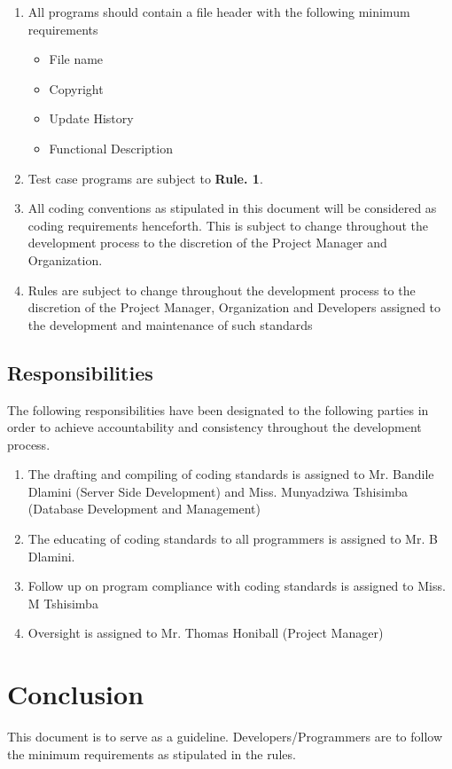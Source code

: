 \documentclass{article}
\begin{document}
\begin{enumerate}
    \item All programs should contain a file header with the following minimum requirements
    \begin{itemize}
        \item File name
        \item Copyright
        \item Update History
        \item Functional Description
    \end{itemize}{}
    
    \item Test case programs are subject to \textbf{Rule. 1}.
    \item All coding conventions as stipulated in this document will be considered as coding requirements henceforth. This is subject to change throughout the development process to the discretion of the Project Manager and Organization.
    \item Rules are subject to change throughout the development process to the discretion of the Project Manager, Organization and Developers assigned to the development and maintenance of such standards
\end{enumerate}

\subsection{Responsibilities}
The following responsibilities have been designated to the following parties in order to achieve accountability and consistency throughout the development process.

\begin{enumerate}
    \item The drafting and compiling of coding standards is assigned to Mr. Bandile Dlamini (Server Side Development) and Miss. Munyadziwa Tshisimba (Database Development and Management)
    \item The educating of coding standards to all programmers is assigned to Mr. B Dlamini.
    \item Follow up on program compliance with coding standards is assigned to Miss. M Tshisimba
    \item Oversight is assigned to Mr. Thomas Honiball (Project Manager)
\end{enumerate}
\section{Conclusion}

This document is to serve as a guideline. Developers/Programmers are to follow the minimum requirements as stipulated in the rules.

\printbibliography
\end{document}

